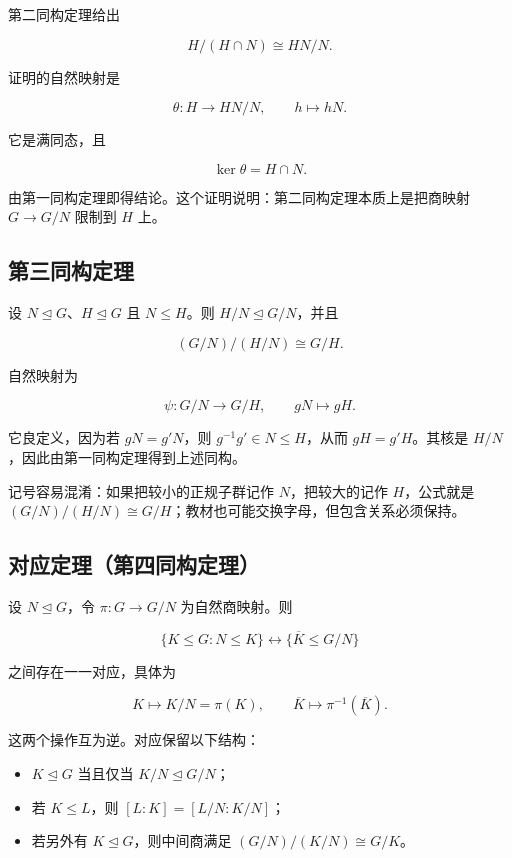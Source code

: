 第二同构定理给出

\[
H/(H\cap N)\cong HN/N.
\]

证明的自然映射是

\[
\theta:H\longrightarrow HN/N,
\qquad h\longmapsto hN.
\]

它是满同态，且

\[
\ker\theta=H\cap N.
\]

由第一同构定理即得结论。这个证明说明：第二同构定理本质上是把商映射 $G\to G/N$ 限制到 $H$ 上。

\subsection{第三同构定理}


设 $N\trianglelefteq G$、$H\trianglelefteq G$ 且 $N\le H$。则 $H/N\trianglelefteq G/N$，并且

\[
(G/N)/(H/N)\cong G/H.
\]

自然映射为

\[
\psi:G/N\longrightarrow G/H,
\qquad gN\longmapsto gH.
\]

它良定义，因为若 $gN=g'N$，则 $g^{-1}g'\in N\le H$，从而 $gH=g'H$。其核是 $H/N$，因此由第一同构定理得到上述同构。

记号容易混淆：如果把较小的正规子群记作 $N$，把较大的记作 $H$，公式就是 $(G/N)/(H/N)\cong G/H$；教材也可能交换字母，但包含关系必须保持。

\subsection{对应定理（第四同构定理）}


设 $N\trianglelefteq G$，令 $\pi:G\to G/N$ 为自然商映射。则

\[
\{K\le G:N\le K\}
\longleftrightarrow
\{\overline K\le G/N\}
\]

之间存在一一对应，具体为

\[
K\longmapsto K/N=\pi(K),
\qquad
\overline K\longmapsto \pi^{-1}(\overline K).
\]

这两个操作互为逆。对应保留以下结构：

\begin{itemize}
\item $K\trianglelefteq G$ 当且仅当 $K/N\trianglelefteq G/N$；
\item 若 $K\le L$，则 $[L:K]=[L/N:K/N]$；
\item 若另外有 $K\trianglelefteq G$，则中间商满足 $(G/N)/(K/N)\cong G/K$。
\end{itemize}


